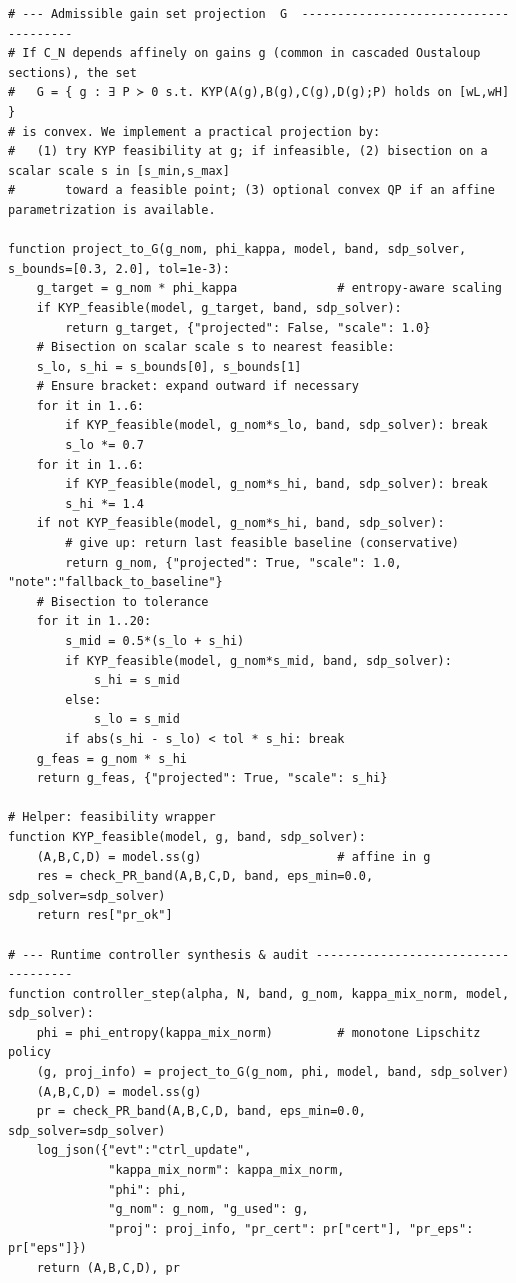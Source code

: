 \documentclass[10pt]{article}
\begin{document}
\begin{lstlisting}
# --- Admissible gain set projection  G  --------------------------------------
# If C_N depends affinely on gains g (common in cascaded Oustaloup sections), the set
#   G = { g : ∃ P ≻ 0 s.t. KYP(A(g),B(g),C(g),D(g);P) holds on [wL,wH] }
# is convex. We implement a practical projection by:
#   (1) try KYP feasibility at g; if infeasible, (2) bisection on a scalar scale s in [s_min,s_max]
#       toward a feasible point; (3) optional convex QP if an affine parametrization is available.

function project_to_G(g_nom, phi_kappa, model, band, sdp_solver, s_bounds=[0.3, 2.0], tol=1e-3):
    g_target = g_nom * phi_kappa              # entropy-aware scaling
    if KYP_feasible(model, g_target, band, sdp_solver):
        return g_target, {"projected": False, "scale": 1.0}
    # Bisection on scalar scale s to nearest feasible:
    s_lo, s_hi = s_bounds[0], s_bounds[1]
    # Ensure bracket: expand outward if necessary
    for it in 1..6:
        if KYP_feasible(model, g_nom*s_lo, band, sdp_solver): break
        s_lo *= 0.7
    for it in 1..6:
        if KYP_feasible(model, g_nom*s_hi, band, sdp_solver): break
        s_hi *= 1.4
    if not KYP_feasible(model, g_nom*s_hi, band, sdp_solver):
        # give up: return last feasible baseline (conservative)
        return g_nom, {"projected": True, "scale": 1.0, "note":"fallback_to_baseline"}
    # Bisection to tolerance
    for it in 1..20:
        s_mid = 0.5*(s_lo + s_hi)
        if KYP_feasible(model, g_nom*s_mid, band, sdp_solver):
            s_hi = s_mid
        else:
            s_lo = s_mid
        if abs(s_hi - s_lo) < tol * s_hi: break
    g_feas = g_nom * s_hi
    return g_feas, {"projected": True, "scale": s_hi}

# Helper: feasibility wrapper
function KYP_feasible(model, g, band, sdp_solver):
    (A,B,C,D) = model.ss(g)                   # affine in g
    res = check_PR_band(A,B,C,D, band, eps_min=0.0, sdp_solver=sdp_solver)
    return res["pr_ok"]

# --- Runtime controller synthesis & audit ------------------------------------
function controller_step(alpha, N, band, g_nom, kappa_mix_norm, model, sdp_solver):
    phi = phi_entropy(kappa_mix_norm)         # monotone Lipschitz policy
    (g, proj_info) = project_to_G(g_nom, phi, model, band, sdp_solver)
    (A,B,C,D) = model.ss(g)
    pr = check_PR_band(A,B,C,D, band, eps_min=0.0, sdp_solver=sdp_solver)
    log_json({"evt":"ctrl_update",
              "kappa_mix_norm": kappa_mix_norm,
              "phi": phi,
              "g_nom": g_nom, "g_used": g,
              "proj": proj_info, "pr_cert": pr["cert"], "pr_eps": pr["eps"]})
    return (A,B,C,D), pr


\end{lstlisting}
\end{document}
